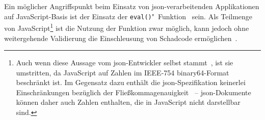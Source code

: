 Ein möglicher Angriffspunkt beim Einsatz von \acrshort{json}-verarbeitenden Applikationen auf JavaScript-Basis ist der Einsatz der \texttt{eval()}"~Funktion~\cite[Abschnitt 18.2.1]{ecma262} sein. Als Teilmenge von JavaScript\footnote{Auch wenn diese Aussage vom \acrshort{json}-Entwickler selbst stammt~\cite{crockford2006fatfree}, ist sie umstritten, da JavaScript auf Zahlen im IEEE-754 binary64-Format~\cite[Abschnitt 6.1.6]{ecma262} beschränkt ist. Im Gegensatz dazu enthält die \acrshort{json}-Spezifikation keinerlei Einschränkungen bezüglich der Fließkommagenauigkeit~\cite[Abschnitt 8]{ecma404} -- \acrshort{json}-Dokumente können daher auch Zahlen enthalten, die in JavaScript nicht darstellbar sind.} ist die Nutzung der Funktion zwar möglich, kann jedoch ohne weitergehende Validierung die Einschleusung von Schadcode ermöglichen~\cite[Abschn.~12]{rfc7159}.
